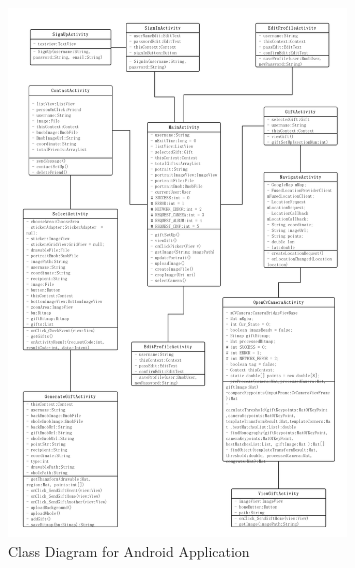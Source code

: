 \begin{figure}[htb]
\centering
\includegraphics[width=0.8\textwidth]{section03/assets/AndroidClassDiagram.png}
\caption[Class Diagram for Android Application]{\label{AndroidClassDiagram}Class Diagram for Android Application}
\end{figure}

